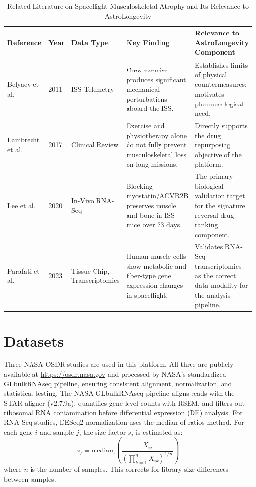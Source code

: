 \documentclass[conference]{IEEEtran}
\begin{document}
\begin{table}[!t]
\centering
\caption{Related Literature on Spaceflight Musculoskeletal Atrophy and Its Relevance to AstroLongevity}
\label{tab:literature}
\small\begin{tabular}{p{2.0cm} p{0.4cm} p{1.9cm} p{5.7cm} p{5.3cm}}
\toprule
\textbf{Reference} & \textbf{Year} & \textbf{Data Type} & \textbf{Key Finding} & \textbf{Relevance to AstroLongevity Component} \\
\midrule
Belyaev et al.~\cite{belyaev2011} & 2011 & ISS Telemetry & Crew exercise produces significant mechanical perturbations aboard the ISS. & Establishes limits of physical countermeasures; motivates pharmacological need. \\
Lambrecht et al.~\cite{lambrecht2017} & 2017 & Clinical Review & Exercise and physiotherapy alone do not fully prevent musculoskeletal loss on long missions. & Directly supports the drug repurposing objective of the platform. \\
Lee et al.~\cite{lee2020} & 2020 & In-Vivo RNA-Seq & Blocking myostatin/ACVR2B preserves muscle and bone in ISS mice over 33 days. & The primary biological validation target for the signature reversal drug ranking component. \\
Parafati et al.~\cite{parafati2023} & 2023 & Tissue Chip, Transcriptomics & Human muscle cells show metabolic and fiber-type gene expression changes in spaceflight. & Validates RNA-Seq transcriptomics as the correct data modality for the analysis pipeline. \\
\bottomrule
\end{tabular}
\end{table}

\section{Datasets}

Three NASA OSDR studies are used in this platform. All three are publicly available at \url{https://osdr.nasa.gov} and processed by NASA's standardized GLbulkRNAseq pipeline, ensuring consistent alignment, normalization, and statistical testing. The NASA GLbulkRNAseq pipeline aligns reads with the STAR aligner (v2.7.9a), quantifies gene-level counts with RSEM, and filters out ribosomal RNA contamination before differential expression (DE) analysis. For RNA-Seq studies, DESeq2 normalization uses the median-of-ratios method. For each gene $i$ and sample $j$, the size factor $s_j$ is estimated as:
\begin{equation}
s_j = \text{median}_i \left( \frac{X_{ij}}{\left(\prod_{k=1}^n X_{ik}\right)^{1/n}} \right)
\label{eq:deseq_norm}
\end{equation}
where $n$ is the number of samples. This corrects for library size differences between samples.
\end{document}
